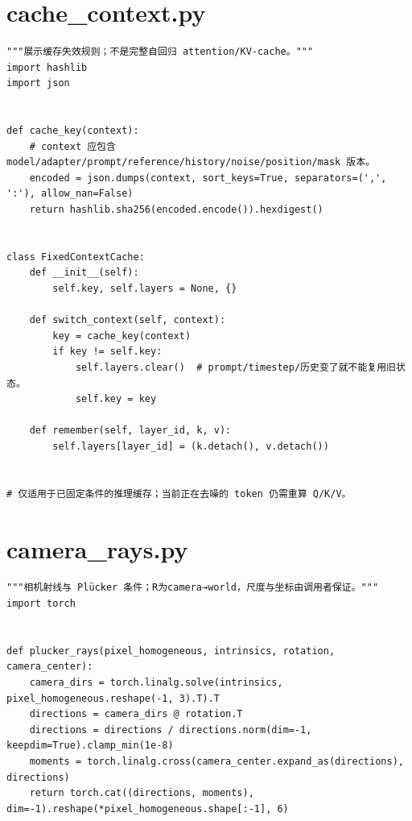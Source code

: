 \section{cache\_context.py}
\label{code-cache-context}
\begin{verbatim}
"""展示缓存失效规则；不是完整自回归 attention/KV-cache。"""
import hashlib
import json


def cache_key(context):
    # context 应包含 model/adapter/prompt/reference/history/noise/position/mask 版本。
    encoded = json.dumps(context, sort_keys=True, separators=(',', ':'), allow_nan=False)
    return hashlib.sha256(encoded.encode()).hexdigest()


class FixedContextCache:
    def __init__(self):
        self.key, self.layers = None, {}

    def switch_context(self, context):
        key = cache_key(context)
        if key != self.key:
            self.layers.clear()  # prompt/timestep/历史变了就不能复用旧状态。
            self.key = key

    def remember(self, layer_id, k, v):
        self.layers[layer_id] = (k.detach(), v.detach())


# 仅适用于已固定条件的推理缓存；当前正在去噪的 token 仍需重算 Q/K/V。
\end{verbatim}

\section{camera\_rays.py}
\label{code-camera-rays}
\begin{verbatim}
"""相机射线与 Plücker 条件；R为camera→world，尺度与坐标由调用者保证。"""
import torch


def plucker_rays(pixel_homogeneous, intrinsics, rotation, camera_center):
    camera_dirs = torch.linalg.solve(intrinsics, pixel_homogeneous.reshape(-1, 3).T).T
    directions = camera_dirs @ rotation.T
    directions = directions / directions.norm(dim=-1, keepdim=True).clamp_min(1e-8)
    moments = torch.linalg.cross(camera_center.expand_as(directions), directions)
    return torch.cat((directions, moments), dim=-1).reshape(*pixel_homogeneous.shape[:-1], 6)
\end{verbatim}


